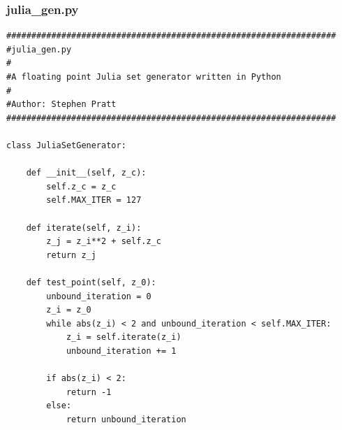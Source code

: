 \documentclass{article}
\begin{document}
\subsubsection{julia\_gen.py}						%
\begin{lstlisting}
##################################################################
#julia_gen.py
#
#A floating point Julia set generator written in Python
#
#Author: Stephen Pratt
##################################################################

class JuliaSetGenerator:
    
    def __init__(self, z_c):
        self.z_c = z_c
        self.MAX_ITER = 127
    
    def iterate(self, z_i):
        z_j = z_i**2 + self.z_c
        return z_j

    def test_point(self, z_0):
        unbound_iteration = 0
        z_i = z_0
        while abs(z_i) < 2 and unbound_iteration < self.MAX_ITER:
            z_i = self.iterate(z_i)
            unbound_iteration += 1

        if abs(z_i) < 2:
            return -1
        else:
            return unbound_iteration
\end{lstlisting}
\end{document}
